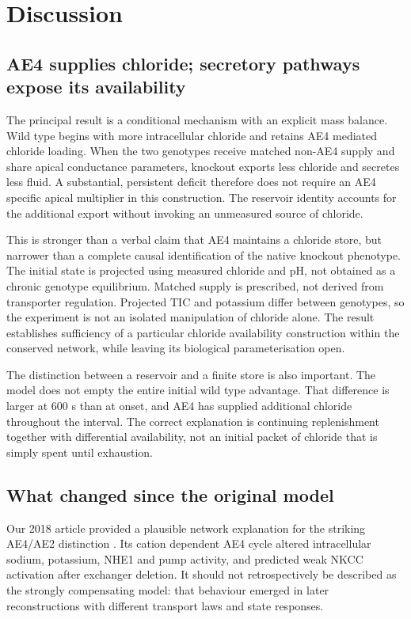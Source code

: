 \section{Discussion}
\label{sec:discussion}

\subsection{AE4 supplies chloride; secretory pathways expose its availability}

The principal result is a conditional mechanism with an explicit mass balance. Wild type begins with more intracellular chloride and retains AE4 mediated chloride loading. When the two genotypes receive matched non-AE4 supply and share apical conductance parameters, knockout exports less chloride and secretes less fluid. A substantial, persistent deficit therefore does not require an AE4 specific apical multiplier in this construction. The reservoir identity accounts for the additional export without invoking an unmeasured source of chloride.

This is stronger than a verbal claim that AE4 maintains a chloride store, but narrower than a complete causal identification of the native knockout phenotype. The initial state is projected using measured chloride and pH, not obtained as a chronic genotype equilibrium. Matched supply is prescribed, not derived from transporter regulation. Projected TIC and potassium differ between genotypes, so the experiment is not an isolated manipulation of chloride alone. The result establishes sufficiency of a particular chloride availability construction within the conserved network, while leaving its biological parameterisation open.

The distinction between a reservoir and a finite store is also important. The model does not empty the entire initial wild type advantage. That difference is larger at 600 s than at onset, and AE4 has supplied additional chloride throughout the interval. The correct explanation is continuing replenishment together with differential availability, not an initial packet of chloride that is simply spent until exhaustion.

\subsection{What changed since the original model}

Our 2018 article provided a plausible network explanation for the striking AE4/AE2 distinction \citep{VeraSiguenza2018}. Its cation dependent AE4 cycle altered intracellular sodium, potassium, NHE1 and pump activity, and predicted weak NKCC activation after exchanger deletion. It should not retrospectively be described as the strongly compensating model: that behaviour emerged in later reconstructions with different transport laws and state responses.

